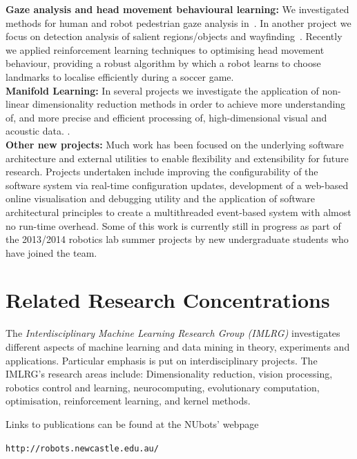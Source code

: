 \documentclass{llncs}
\begin{document}
\noindent\textbf{Gaze analysis and head movement behavioural learning:} We investigated methods for human and robot pedestrian gaze analysis in~\cite{JalalianEtAl_CAADRIA2011,WongEtAl2012}. In another project we focus on detection analysis of salient regions/objects and wayfinding~\cite{BhatiaEtAl2012}. Recently we  applied reinforcement learning techniques to optimising head movement behaviour, providing a robust algorithm by which a robot learns to choose landmarks to localise efficiently during a soccer game. 
\\

\noindent\textbf{Manifold Learning:} In several projects we
investigate the application of non-linear dimensionality reduction
methods in order to achieve more understanding of, and more precise 
and efficient processing of, high-dimensional visual and acoustic data.
\cite{ChalupEtAl2007b,WongChalup_WCCI_2008,WongChalup2008,WongEtAl2012}.
\\

\noindent\textbf{Other new projects:} Much work has been focused on the underlying software architecture and external utilities to enable flexibility and extensibility for future research. Projects undertaken include improving the configurability of the software system via real-time configuration updates, development of a web-based online visualisation and debugging utility and the application of software architectural principles to create a multithreaded event-based system with almost no run-time overhead. Some of this work is currently still in progress as part of the 2013/2014 robotics lab summer projects by new undergraduate students who have joined the team.

\section{Related Research Concentrations}

The \emph{Interdisciplinary Machine Learning Research Group (IMLRG)} investigates different aspects of machine learning and data mining in theory, experiments and applications. Particular emphasis is put on interdisciplinary projects. The IMLRG's research areas include: Dimensionality reduction, vision processing, robotics control and learning, neurocomputing, evolutionary computation, optimisation, reinforcement learning, and kernel methods.

\noindent Links to publications can be found at the NUbots' webpage
\begin{center}
\texttt{http://robots.newcastle.edu.au/}
\end{center}
\end{document}
